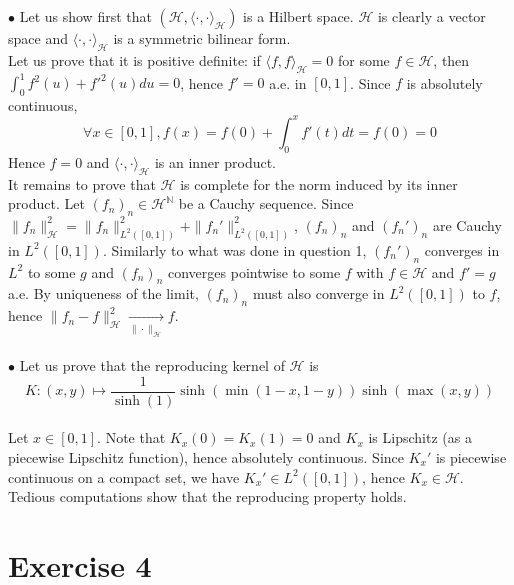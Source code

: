 \documentclass[a4paper,11pt, hidelinks]{article}
\begin{document}
\begin{enumerate}
  $\bullet$ Let us show first that $(\mathcal H, \langle \cdot, \cdot \rangle_{\mathcal H})$ is a Hilbert space. $\mathcal H$ is clearly a vector space and $\langle \cdot, \cdot \rangle_{\mathcal H}$ is a symmetric bilinear form.\\ 
  Let us prove that it is positive definite: if $\langle f, f \rangle_{\mathcal H}=0$ for some $f\in \mathcal H$, then $\int_0^1 f^2(u) + f'^2(u) du = 0$, hence $f'=0$ a.e. in $[0,1]$. Since $f$ is absolutely continuous, $$\forall x \in [0,1], f(x) = f(0)+\int_0^x f'(t) dt = f(0) = 0$$
  Hence $f=0$ and $\langle \cdot, \cdot \rangle_{\mathcal H}$ is an inner product.\\
  It remains to prove that $\mathcal H$ is complete for the norm induced by its inner product. Let $(f_n)_n \in \mathcal H^{\mathbb N}$ be a Cauchy sequence. Since $\|f_n\|_{\mathcal H}^2 = \|f_n\|_{L^2([0,1])}^2 + \|f_n'\|_{L^2([0,1])}^2$, $(f_n)_n$ and $(f_n')_n$ are Cauchy in $L^2([0,1])$. Similarly to what was done in question 1, $(f_n')_n$ converges in $L^2$ to some $g$ and $(f_n)_n$ converges pointwise to some $f$ with $f\in \mathcal H$ and $f'=g$ a.e. By uniqueness of the limit, $(f_n)_n$ must also converge in $L^2([0,1])$ to $f$, hence $\|f_n-f\|_{\mathcal H}^2 \xrightarrow[\|\cdot\|_{\mathcal H}]{} f$.\\
  \\
  $\bullet$ Let us prove that the reproducing kernel of $\mathcal H$ is $$\displaystyle K:(x,y)\mapsto \frac{1}{\sinh(1)}\sinh(\min(1-x,1-y))\sinh(\max(x,y))$$\\
  Let $x\in [0,1]$. Note that $K_x(0)=K_x(1)=0$ and $K_x$ is Lipschitz (as a piecewise Lipschitz function), hence absolutely continuous. Since $K_x'$ is piecewise continuous on a compact set, we have $K_x' \in L^2([0,1])$, hence $K_x\in \mathcal H$.\\
  Tedious computations show that the reproducing property holds.
\end{enumerate}

\section*{Exercise 4}
\end{document}
